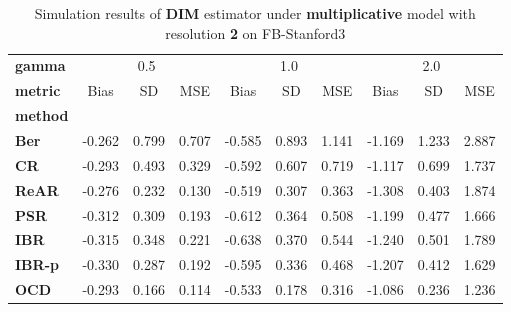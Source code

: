 \begin{table}
\centering
\caption{Simulation results of \textbf{DIM} estimator under \textbf{multiplicative} model with resolution \textbf{2} on FB-Stanford3}
\begin{tabular}{lccccccccc}
\toprule
\textbf{gamma} & \multicolumn{3}{c}{0.5} & \multicolumn{3}{c}{1.0} & \multicolumn{3}{c}{2.0} \\
\textbf{metric} &   Bias &     SD &    MSE &   Bias &     SD &    MSE &   Bias &     SD &    MSE \\
\textbf{method} &        &        &        &        &        &        &        &        &        \\
\midrule
\textbf{Ber} & -0.262 &  0.799 &  0.707 & -0.585 &  0.893 &  1.141 & -1.169 &  1.233 &  2.887 \\
\textbf{CR} & -0.293 &  0.493 &  0.329 & -0.592 &  0.607 &  0.719 & -1.117 &  0.699 &  1.737 \\
\textbf{ReAR} & -0.276 &  0.232 &  0.130 & -0.519 &  0.307 &  0.363 & -1.308 &  0.403 &  1.874 \\
\textbf{PSR} & -0.312 &  0.309 &  0.193 & -0.612 &  0.364 &  0.508 & -1.199 &  0.477 &  1.666 \\
\textbf{IBR} & -0.315 &  0.348 &  0.221 & -0.638 &  0.370 &  0.544 & -1.240 &  0.501 &  1.789 \\
\textbf{IBR-p} & -0.330 &  0.287 &  0.192 & -0.595 &  0.336 &  0.468 & -1.207 &  0.412 &  1.629 \\
\textbf{OCD} & -0.293 &  0.166 &  0.114 & -0.533 &  0.178 &  0.316 & -1.086 &  0.236 &  1.236 \\
\bottomrule
\end{tabular}
\end{table}
